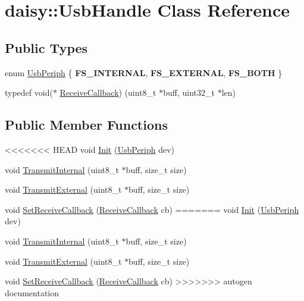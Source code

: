 \hypertarget{classdaisy_1_1_usb_handle}{}\section{daisy\+:\+:Usb\+Handle Class Reference}
\label{classdaisy_1_1_usb_handle}
\subsection*{Public Types}
\begin{DoxyCompactItemize}
\item 
enum \hyperlink{classdaisy_1_1_usb_handle_ad2a37421ade061875a30765e2b2e1318}{Usb\+Periph} \{ {\bfseries F\+S\+\_\+\+I\+N\+T\+E\+R\+N\+AL}, 
{\bfseries F\+S\+\_\+\+E\+X\+T\+E\+R\+N\+AL}, 
{\bfseries F\+S\+\_\+\+B\+O\+TH}
 \}
\item 
typedef void($\ast$ \hyperlink{classdaisy_1_1_usb_handle_abd7ee9319fb0f5fa73f2c45e8ba14080}{Receive\+Callback}) (uint8\+\_\+t $\ast$buff, uint32\+\_\+t $\ast$len)
\end{DoxyCompactItemize}
\subsection*{Public Member Functions}
\begin{DoxyCompactItemize}
\item 
<<<<<<< HEAD
void \hyperlink{classdaisy_1_1_usb_handle_ab66484e20fbef1d7b1397403a69768ea}{Init} (\hyperlink{classdaisy_1_1_usb_handle_ad2a37421ade061875a30765e2b2e1318}{Usb\+Periph} dev)
\item 
void \hyperlink{classdaisy_1_1_usb_handle_aaff1689cd8310f0b741829d6568f2ad0}{Transmit\+Internal} (uint8\+\_\+t $\ast$buff, size\+\_\+t size)
\item 
void \hyperlink{classdaisy_1_1_usb_handle_a66ba310745890b4ef51b923154b86fbf}{Transmit\+External} (uint8\+\_\+t $\ast$buff, size\+\_\+t size)
\item 
void \hyperlink{classdaisy_1_1_usb_handle_a14695d78459745b5749732ddd25317ae}{Set\+Receive\+Callback} (\hyperlink{classdaisy_1_1_usb_handle_abd7ee9319fb0f5fa73f2c45e8ba14080}{Receive\+Callback} cb)
=======
void \hyperlink{classdaisy_1_1_usb_handle_a0e30c290afb4d303ecf3b0c83d71f24d}{Init} (\hyperlink{classdaisy_1_1_usb_handle_ad2a37421ade061875a30765e2b2e1318}{Usb\+Periph} dev)
\item 
void \hyperlink{classdaisy_1_1_usb_handle_a990bf276c07c7e3f1ca122f7e320b303}{Transmit\+Internal} (uint8\+\_\+t $\ast$buff, size\+\_\+t size)
\item 
void \hyperlink{classdaisy_1_1_usb_handle_a46756800105521559e52a91a8b0efd3a}{Transmit\+External} (uint8\+\_\+t $\ast$buff, size\+\_\+t size)
\item 
void \hyperlink{classdaisy_1_1_usb_handle_ab8a881e946f264682ccb34a3b79ef55d}{Set\+Receive\+Callback} (\hyperlink{classdaisy_1_1_usb_handle_abd7ee9319fb0f5fa73f2c45e8ba14080}{Receive\+Callback} cb)
>>>>>>> autogen documentation
\end{DoxyCompactItemize}


